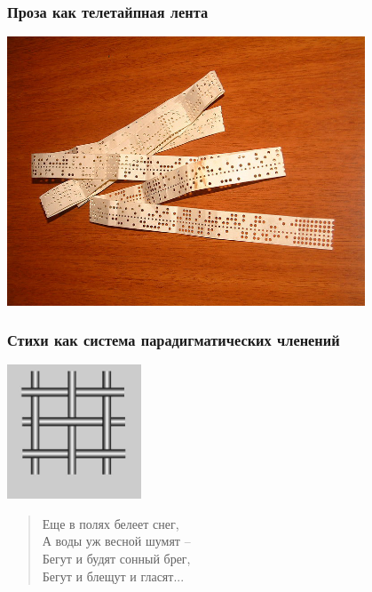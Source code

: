 \documentclass{beamer}
\begin{document}

\begin{frame}
\frametitle{Проза как телетайпная лента}

\begin{center}
\includegraphics[width=0.8\textwidth]{lenta.png}
\end{center}

\end{frame}


\begin{frame}
\frametitle{Стихи как система парадигматических членений}

\begin{center}
\includegraphics[width=0.3\textwidth]{reshetka.jpg}
\end{center}

\begin{verse}
Еще в полях белеет \color{red}снег, \\
\color{black}А воды уж весной \color{green}шумят – \\
\color{blue}Бегут \color{black}и будят сонный \color{red}брег, \\
\color{blue}Бегут \color{black}и блещут и \color{green}гласят\color{black}...
\end{verse}
\end{frame}
\end{document}
